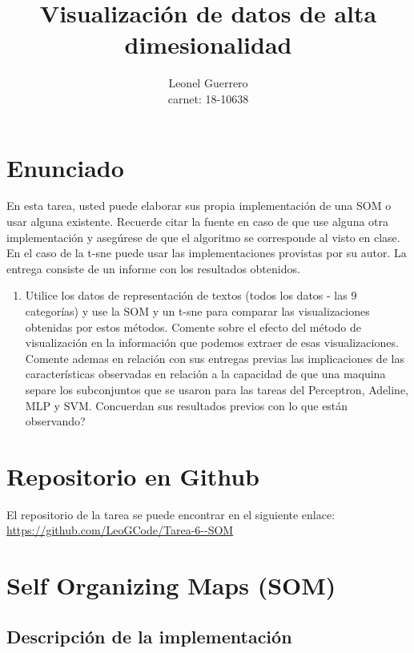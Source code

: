 \documentclass{article}
\title{Visualización de datos de alta dimesionalidad}
\author{Leonel Guerrero\\ carnet: 18-10638}
\theoremstyle{mytheoremstyle}
\theoremstyle{mytheoremstyle}
\theoremstyle{myproblemstyle}
\begin{document}
\maketitle

\section*{Enunciado}

En esta tarea, usted puede elaborar sus propia implementación de una SOM o usar alguna existente. Recuerde citar la fuente en caso de que use alguna otra implementación y asegúrese de que el algoritmo se corresponde al visto en clase. En el caso de la t-sne puede usar las implementaciones provistas por su autor. La entrega consiste de un informe con los resultados obtenidos.

\begin{enumerate}
  \item Utilice los datos de representación de textos (todos los datos - las 9 categorías) y use la SOM y un t-sne para comparar las visualizaciones obtenidas por estos métodos. Comente sobre el efecto del método de visualización en la información que podemos extraer de esas visualizaciones. Comente ademas en relación con sus entregas previas las implicaciones de las características observadas en relación a la capacidad de que una maquina separe los subconjuntos que se usaron para las tareas del Perceptron, Adeline, MLP y SVM. Concuerdan sus resultados previos con lo que están observando?
\end{enumerate}

\section*{Repositorio en Github}

El repositorio de la tarea se puede encontrar en el siguiente enlace: \url{https://github.com/LeoGCode/Tarea-6--SOM}

\section*{Self Organizing Maps (SOM)}

\subsection*{Descripción de la implementación}
\end{document}
